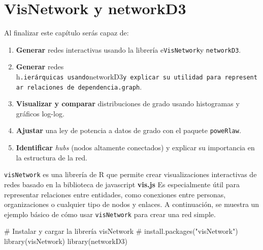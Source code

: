 \documentclass[
  letterpaper,
  DIV=11,
  numbers=noendperiod]{scrreprt}
\newenvironment{Shaded}{\begin{snugshade}}{\end{snugshade}}
\newcommand{\CommentTok}[1]{\textcolor[rgb]{0.37,0.37,0.37}{#1}}
\newcommand{\FunctionTok}[1]{\textcolor[rgb]{0.28,0.35,0.67}{#1}}
\newcommand{\NormalTok}[1]{\textcolor[rgb]{0.00,0.23,0.31}{#1}}
\providecommand{\tightlist}{%
  \setlength{\itemsep}{0pt}\setlength{\parskip}{0pt}}
\begin{document}

\chapter{VisNetwork y networkD3}\label{Visnetwork}

\begin{tcolorbox}[enhanced jigsaw, toprule=.15mm, colframe=quarto-callout-note-color-frame, coltitle=black, titlerule=0mm, colback=white, breakable, leftrule=.75mm, arc=.35mm, bottomtitle=1mm, toptitle=1mm, rightrule=.15mm, bottomrule=.15mm, left=2mm, title=\textcolor{quarto-callout-note-color}{\faInfo}\hspace{0.5em}{🎯 Objetivos de aprendizaje}, colbacktitle=quarto-callout-note-color!10!white, opacityback=0, opacitybacktitle=0.6]

Al finalizar este capítulo serás capaz de:

\begin{enumerate}
\def\labelenumi{\arabic{enumi}.}
\tightlist
\item
  \textbf{Generar } redes interactivas usando la librería
  e\texttt{VisNetwork}y \texttt{networkD3}.
\item
  \textbf{Generar} redes
  h\texttt{.ierárquicas\ usando}networkD3\texttt{y\ explicar\ su\ utilidad\ para\ representar\ relaciones\ de\ dependencia.graph}.
\item
  \textbf{Visualizar y comparar} distribuciones de grado usando
  histogramas y gráficos log-log.
\item
  \textbf{Ajustar} una ley de potencia a datos de grado con el paquete
  \texttt{poweRlaw}.
\item
  \textbf{Identificar} \emph{hubs} (nodos altamente conectados) y
  explicar su importancia en la estructura de la red.
\end{enumerate}

\end{tcolorbox}

\texttt{visNetwork} es una librería de R que permite crear
visualizaciones interactivas de redes basado en la biblioteca de
javascript \textbf{vis.js} Es especialmente útil para representar
relaciones entre entidades, como conexiones entre personas,
organizaciones o cualquier tipo de nodos y enlaces. A continuación, se
muestra un ejemplo básico de cómo usar \texttt{visNetwork} para crear
una red simple.

\begin{Shaded}
\begin{Highlighting}[]
\CommentTok{\# Instalar y cargar la librería visNetwork}
\CommentTok{\# install.packages("visNetwork")}
\FunctionTok{library}\NormalTok{(visNetwork)}
\FunctionTok{library}\NormalTok{(networkD3)}
\end{Highlighting}
\end{Shaded}
\end{document}

